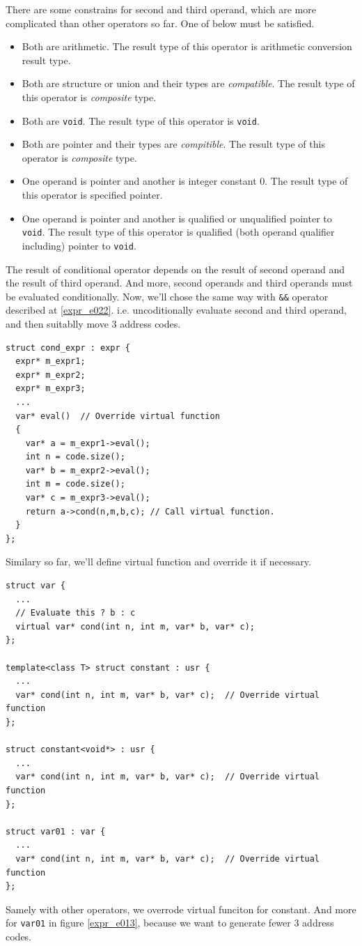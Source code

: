 There are some constrains for second and third operand, which are
more complicated than other operators so far. One of below must
be satisfied.
\begin{itemize}
\item Both are arithmetic. The result type of this operator
      is arithmetic conversion result type.

\item Both are structure or union and their types are {\em compatible}.
      The result type of this operator is {\em composite} type.

\item Both are {\tt{void}}. The result type of this operator
      is {\tt{void}}.

\item Both are pointer and their types are {\em compitible}.
      The result type of this operator is {\em composite} type.

\item One operand is pointer and another is integer constant 0.
      The result type of this operator is specified pointer.

\item One operand is pointer and another is qualified or unqualified
      pointer to {\tt{void}}. The result type of this operator is
      qualified (both operand qualifier including) pointer to
      {\tt{void}}.
\end{itemize}
The result of conditional operator depends on the result of second 
operand and the result of third operand. And more, second operands
and third operands must be evaluated conditionally. Now, we'll 
chose the same way with {\tt{\&\&}} operator described at
\ref{expr_e022}. i.e. uncoditionally evaluate second and third operand,
and then suitablly move 3 address codes.
\begin{verbatim}
struct cond_expr : expr {
  expr* m_expr1;
  expr* m_expr2;
  expr* m_expr3;
  ...
  var* eval()  // Override virtual function
  {
    var* a = m_expr1->eval();
    int n = code.size();
    var* b = m_expr2->eval();
    int m = code.size();
    var* c = m_expr3->eval();
    return a->cond(n,m,b,c); // Call virtual function.
  }
};
\end{verbatim}
Similary so far, we'll define virtual function and override it if
necessary.
\begin{verbatim}
struct var {
  ...
  // Evaluate this ? b : c
  virtual var* cond(int n, int m, var* b, var* c);
};

template<class T> struct constant : usr {
  ...
  var* cond(int n, int m, var* b, var* c);  // Override virtual function
};

struct constant<void*> : usr {
  ...
  var* cond(int n, int m, var* b, var* c);  // Override virtual function
};

struct var01 : var {
  ...
  var* cond(int n, int m, var* b, var* c);  // Override virtual function
};
\end{verbatim}
Samely with other operators, we overrode virtual funciton
for constant. And more for {\tt{var01}} in figure \ref{expr_e013},
because we want to generate fewer 3 address codes.

